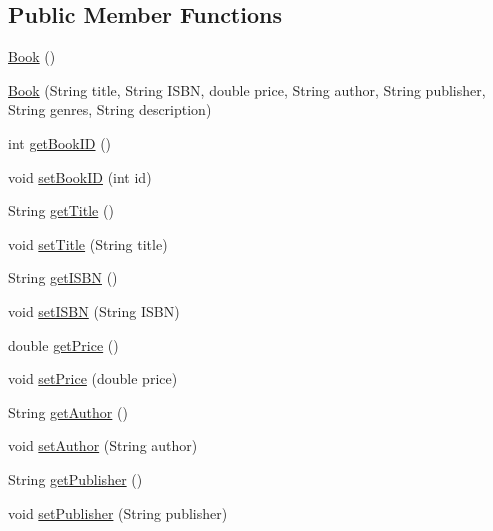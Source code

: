 \subsection*{Public Member Functions}
\begin{DoxyCompactItemize}
\item 
\hyperlink{classw3se_1_1_model_1_1_base_1_1_book_a957abf871d1dd9a4c18d9b5e77ae4242}{Book} ()
\item 
\hyperlink{classw3se_1_1_model_1_1_base_1_1_book_a0d35c7fffd94346000a2f8ecd70b8adf}{Book} (String title, String I\-S\-B\-N, double price, String author, String publisher, String genres, String description)
\item 
int \hyperlink{classw3se_1_1_model_1_1_base_1_1_book_ad6d937f8ae29651eb2a64ea99bb1ca87}{get\-Book\-I\-D} ()
\item 
void \hyperlink{classw3se_1_1_model_1_1_base_1_1_book_a059edbe1ab6d51ceeedf29077160b746}{set\-Book\-I\-D} (int id)
\item 
String \hyperlink{classw3se_1_1_model_1_1_base_1_1_book_a18e59f5456da665850f468a65c2cfa97}{get\-Title} ()
\item 
void \hyperlink{classw3se_1_1_model_1_1_base_1_1_book_a5924d03c23180fefa8c0e50a882e2bec}{set\-Title} (String title)
\item 
String \hyperlink{classw3se_1_1_model_1_1_base_1_1_book_a802bd79e3f87137ce2f2d2a5f856c44d}{get\-I\-S\-B\-N} ()
\item 
void \hyperlink{classw3se_1_1_model_1_1_base_1_1_book_a05a1efc2d0ca9679af1d696645c642cd}{set\-I\-S\-B\-N} (String I\-S\-B\-N)
\item 
double \hyperlink{classw3se_1_1_model_1_1_base_1_1_book_a950d801ac1823d972ba8c190516b8db0}{get\-Price} ()
\item 
void \hyperlink{classw3se_1_1_model_1_1_base_1_1_book_a7d260cc33cd6473f9a950fc8397e4227}{set\-Price} (double price)
\item 
String \hyperlink{classw3se_1_1_model_1_1_base_1_1_book_a2d2e3283bd4e6f9d455286237c72811b}{get\-Author} ()
\item 
void \hyperlink{classw3se_1_1_model_1_1_base_1_1_book_ad32713ad327e9112b862ac8488ed43cd}{set\-Author} (String author)
\item 
String \hyperlink{classw3se_1_1_model_1_1_base_1_1_book_a3d2eb907282e8cc07c1a3e6f48affdf4}{get\-Publisher} ()
\item 
void \hyperlink{classw3se_1_1_model_1_1_base_1_1_book_a4d7d84efdf711d004c46221e822a4511}{set\-Publisher} (String publisher)
\item 

\end{DoxyCompactItemize}
